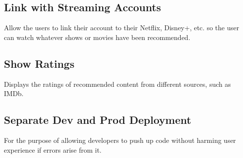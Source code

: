 \documentclass{article}
\begin{document}
\subsection{Link with Streaming Accounts}
Allow the users to link their account to their Netflix, Disney+, etc. so the user can watch whatever shows or movies have been recommended.

\subsection{Show Ratings}
Displays the ratings of recommended content from different sources, such as IMDb.

\subsection{Separate Dev and Prod Deployment}
For the purpose of allowing developers to push up code without harming user experience if errors arise from it.
\end{document}
